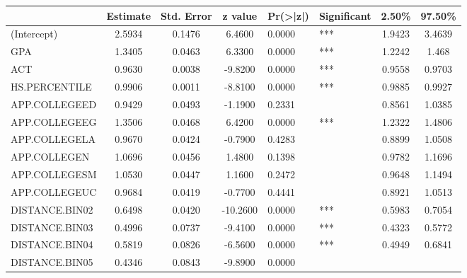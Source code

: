 \documentclass[12pt,english]{report}
\begin{document}
\begin{table}[]
\centering
\begin{adjustbox}{width=1.05\textwidth}

\begin{tabular}{lcccllcc}
\\[-1.8ex]\hline
\hline

                               & Estimate & Std. Error & z value  &
Pr(\textgreater|z|) & Significant & 2.50\% & 97.50\% \\ 
 \hline
(Intercept)                     & 2.5934   & 0.1476     & 6.4600   & 0.0000    
& ***         & 1.9423 & 3.4639  \\
GPA                             & 1.3405   & 0.0463     & 6.3300   & 0.0000    
& ***         & 1.2242 & 1.468   \\
ACT                             & 0.9630   & 0.0038     & -9.8200  & 0.0000    
& ***         & 0.9558 & 0.9703  \\
HS.PERCENTILE                   & 0.9906   & 0.0011     & -8.8100  & 0.0000    
& ***         & 0.9885 & 0.9927  \\
APP.COLLEGEED                   & 0.9429   & 0.0493     & -1.1900  & 0.2331    
&             & 0.8561 & 1.0385  \\
APP.COLLEGEEG                   & 1.3506   & 0.0468     & 6.4200   & 0.0000    
& ***         & 1.2322 & 1.4806  \\
APP.COLLEGELA                   & 0.9670   & 0.0424     & -0.7900  & 0.4283    
&             & 0.8899 & 1.0508  \\
APP.COLLEGEN                    & 1.0696   & 0.0456     & 1.4800   & 0.1398    
&             & 0.9782 & 1.1696  \\
APP.COLLEGESM                   & 1.0530   & 0.0447     & 1.1600   & 0.2472    
&             & 0.9648 & 1.1494  \\
APP.COLLEGEUC                   & 0.9684   & 0.0419     & -0.7700  & 0.4441    
&             & 0.8921 & 1.0513  \\
DISTANCE.BIN02                  & 0.6498   & 0.0420     & -10.2600 & 0.0000    
& ***         & 0.5983 & 0.7054  \\
DISTANCE.BIN03                  & 0.4996   & 0.0737     & -9.4100  & 0.0000    
& ***         & 0.4323 & 0.5772  \\
DISTANCE.BIN04                  & 0.5819   & 0.0826     & -6.5600  & 0.0000    
& ***         & 0.4949 & 0.6841  \\
DISTANCE.BIN05                  & 0.4346   & 0.0843     & -9.8900  & 0.0000    

\end{tabular}
\end{adjustbox}
\end{table}
\end{document}
